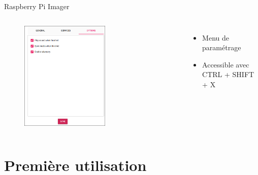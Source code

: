 \documentclass[aspectratio=169,xcolor=dvipsnames]{beamer}
\begin{document}
\begin{frame}{Raspberry Pi Imager}
    \begin{columns}[c] %

        \begin{figure}
            \includegraphics[width=0.6\textwidth]{1/rpi-imager-3.png}
        \end{figure}

        \begin{itemize}
            \item Menu de paramétrage
            \item Accessible avec CTRL + SHIFT + X
        \end{itemize}

    \end{columns}
\end{frame}

\section{Première utilisation}
\end{document}
